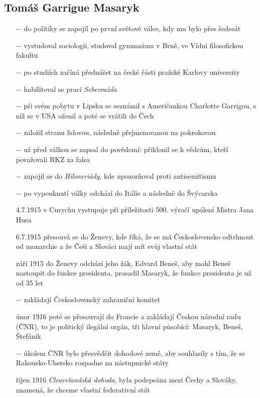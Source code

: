 \documentclass{article}
\begin{document}
\subsection*{Tomáš Garrigue Masaryk}
\begin{itemize}
    \vspace{-0.5em}
    \setlength\itemsep{0.15em}
    \item[$-$] do politiky se zapojil po první světové válce, kdy mu bylo přes šedesát
    \item[$-$] vystudoval sociologii, studoval gymnasium v Brně, ve Vídni filosofickou fakultu
    \item[$-$] po studiích začíná přednášet na české části pražské Karlovy university
    \item[$-$] habilitoval se prací \textit{Sebevražda}
    \item[$-$] při svém pobytu v Lipsku se seznámil s Američankou Charlotte Garrigou, s níž se v USA oženil a poté se vrátili do Čech
    \item[$-$] založil stranu lidovou, následně přejmenovanou na pokrokovou
    \item[$-$] už před válkou se zapsal do povědomí: přiklonil se k vědcům, kteří považovali RKZ za falsa
    \item[$-$] zapojil se do \textit{Hilsneriády}, kde upozorňoval proti antisemitismu
    \item[$-$] po vypouknutí války odchází do Itálie a následně do Švýcarska
    \item[4.7.1915] v Curychu vystupuje při příležitosti 500. výročí upálení Mistra Jana Husa
    \item[6.7.1915] přesouvá se do Ženevy, kde říká, že se má Československo odtrhnout od monarchie a že Češi a Slováci mají mít svůj vlastní stát
    \item[září 1915] do Ženevy odchází jeho žák, Edvard Beneš, aby mohl Beneš nastoupit do funkce presidenta, prosadil Masaryk, že funkce presidenta je už od 35 let
    \item[$-$] zakládají Československý zahraniční komitet
    \item[únor 1916] poté se přesouvají do Francie a zakládají Českou národní radu (ČNR), to je politický ilegální orgán, tři hlavní působící: Masaryk, Beneš, Štefánik
    \item[$-$] úkolem ČNR bylo přesvědčit dohodové země, aby souhlasily s tím, že se Rakousko-Uhersko rozpadne na nástupnické státy
    \item[říjen 1916] \textit{Cleavelandská dohoda}, byla podepsána mezi Čechy a Slováky, znamená, že chceme vlastní federativní stát
\end{itemize}
\end{document}
